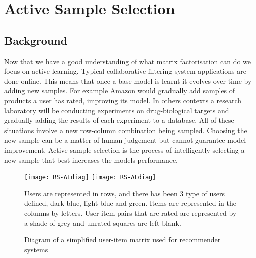 \chapter{Active Sample Selection}
\ifpdf
    \graphicspath{{Chapter2/Chapter2Figs/PNG/}{Chapter2/Chapter2Figs/PDF/}{Chapter2/Chapter2Figs/}}
\else
    \graphicspath{{Chapter2/Chapter2Figs/EPS/}{Chapter2/Chapter2Figs/}}
\fi
{}
\section{Background}

Now that we have a good understanding of what matrix factorisation can do we focus on active learning. Typical collaborative filtering system applications are done online. This means that once a base model is learnt it evolves over time by adding new samples. For example Amazon would gradually add samples of products a user has rated, improving its model. In others contexts a research laboratory will be conducting experiments on drug-biological targets and gradually adding the results of each experiment to a database. All of these situations involve a new row-column combination being sampled. Choosing the new sample can be a matter of human judgement but cannot guarantee model improvement. Active sample selection is the process of intelligently selecting a new sample that best increases the models performance.

\begin{figure}[H]
  \begin{center}
    \leavevmode
    \ifpdf
      \texttt{[image: RS-ALdiag]}
    \else
      \texttt{[image: RS-ALdiag]}
    \fi
    \end{center}
Users are represented in rows, and there has been 3 type of users deﬁned, dark blue, light blue and green. Items are represented in the columns by letters. User item pairs that are rated are represented by a shade of grey and unrated squares are left blank.
    \caption{Diagram of a simpliﬁed user-item matrix used for recommender systems}
    \label{fig:al-diag}
\end{figure}

